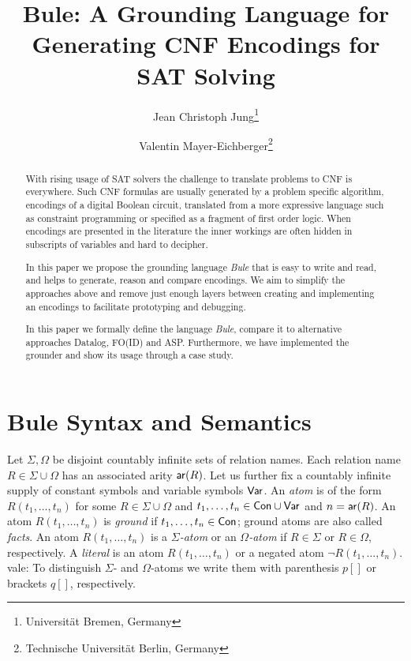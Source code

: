 \documentclass{article}
\title{Bule: A Grounding Language for Generating CNF Encodings for SAT Solving}
\author{Jean Christoph Jung\footnote{Universität Bremen, Germany} \and Valentin Mayer-Eichberger\footnote{Technische Universit\"at Berlin, Germany} \and 
}
\newcommand{\vale}[1]{\textcolor[rgb]{0.00,0.00,0.54296875}{vale: #1} }
\begin{document}
\maketitle

\begin{abstract}
    With rising usage of SAT solvers the challenge to translate problems to CNF
    is everywhere. Such  CNF formulas are usually generated by a problem
    specific algorithm, encodings of a digital Boolean circuit, translated from
    a more expressive language such as constraint programming or specified as a
    fragment of first order logic. When encodings are  presented in the
    literature the inner workings are often hidden in subscripts of variables
    and hard to decipher.

    In this paper we propose the grounding language \emph{Bule} that is easy to
    write and read, and helps to generate, reason and compare encodings. We aim
    to simplify the approaches above and remove just enough layers between
    creating and implementing an encodings to facilitate prototyping and
    debugging. 

    In this paper we formally define the language \emph{Bule}, compare it to
    alternative approaches Datalog, FO(ID) and ASP. Furthermore, we have
    implemented the grounder and show its usage through a case study.
\end{abstract}

\section{Bule Syntax and Semantics}

Let $\Sigma,\Omega$ be disjoint countably infinite sets of relation
names. Each relation name $R\in \Sigma\cup\Omega$ has an associated
arity $\mathsf{ar}(R)$. Let us further fix a countably infinite supply of
constant symbols  and variable symbols $\mathsf{Var}$. An
\emph{atom} is of the form $R(t_1,\ldots,t_n)$ for some $R\in
\Sigma\cup\Omega$ and $t_1,\ldots,t_n\in\mathsf{Con}\cup\mathsf{Var}$ and
$n=\mathsf{ar}(R)$. An atom $R(t_1,\ldots,t_n)$ is \emph{ground} if
$t_1,\ldots,t_n\in\mathsf{Con}$; ground atoms are also called
\emph{facts}. An atom $R(t_1,\ldots,t_n)$ is a \emph{$\Sigma$-atom} or
an \emph{$\Omega$-atom} if $R\in \Sigma$ or $R\in \Omega$,
respectively. A \emph{literal} is an atom $R(t_1,\ldots,t_n)$ or a negated atom
$\neg R(t_1,\ldots,t_n)$. \vale{To distinguish $\Sigma$- and $\Omega$-atoms we
write them with parenthesis $p[]$ or brackets $q[]$, respectively. }
\end{document}
